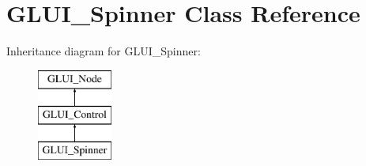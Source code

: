 \hypertarget{classGLUI__Spinner}{\section{G\-L\-U\-I\-\_\-\-Spinner Class Reference}
\label{classGLUI__Spinner}
}
Inheritance diagram for G\-L\-U\-I\-\_\-\-Spinner\-:\begin{figure}[H]
\begin{center}
\leavevmode
\includegraphics[height=3.000000cm]{classGLUI__Spinner}
\end{center}
\end{figure}
